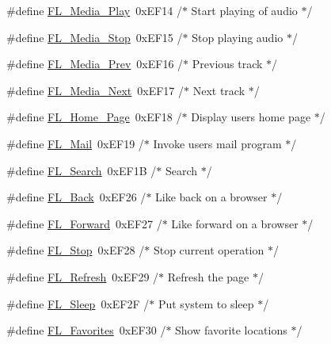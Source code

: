 \begin{Indent}
\begin{DoxyCompactItemize}
\#define \hyperlink{_enumerations_8_h_ad835d80c11553c5910cbf57f17ff77b6}{F\+L\+\_\+\+Media\+\_\+\+Play}~0x\+E\+F14   /$\ast$ Start playing of audio     $\ast$/
\item 
\#define \hyperlink{_enumerations_8_h_a313d081817e6499ae861f95d8c138b0c}{F\+L\+\_\+\+Media\+\_\+\+Stop}~0x\+E\+F15   /$\ast$ Stop playing audio         $\ast$/
\item 
\#define \hyperlink{_enumerations_8_h_a1e8fb91e68eb70283b4f76afca3529fb}{F\+L\+\_\+\+Media\+\_\+\+Prev}~0x\+E\+F16   /$\ast$ Previous track             $\ast$/
\item 
\#define \hyperlink{_enumerations_8_h_a08a4c02d77576954b914b4708d8a8ecb}{F\+L\+\_\+\+Media\+\_\+\+Next}~0x\+E\+F17   /$\ast$ Next track                 $\ast$/
\item 
\#define \hyperlink{_enumerations_8_h_a6f8bd6f6a981fcd248499fe474290c30}{F\+L\+\_\+\+Home\+\_\+\+Page}~0x\+E\+F18   /$\ast$ Display user\textquotesingle{}s home page   $\ast$/
\item 
\#define \hyperlink{_enumerations_8_h_a210eaddbc06c881344b2a1f3f96c33c9}{F\+L\+\_\+\+Mail}~0x\+E\+F19   /$\ast$ Invoke user\textquotesingle{}s mail program $\ast$/
\item 
\#define \hyperlink{_enumerations_8_h_a34ab838e1b43b0f3032fd8949a9cdc97}{F\+L\+\_\+\+Search}~0x\+E\+F1\+B   /$\ast$ Search                     $\ast$/
\item 
\#define \hyperlink{_enumerations_8_h_a4d84842f7c280df258fd0fb8bad02e98}{F\+L\+\_\+\+Back}~0x\+E\+F26   /$\ast$ Like back on a browser     $\ast$/
\item 
\#define \hyperlink{_enumerations_8_h_a48da3f51baf7f6c3c7cc8991b3db822c}{F\+L\+\_\+\+Forward}~0x\+E\+F27   /$\ast$ Like forward on a browser  $\ast$/
\item 
\#define \hyperlink{_enumerations_8_h_ae71aa5f48130c62ab9f4162ebaf3702d}{F\+L\+\_\+\+Stop}~0x\+E\+F28   /$\ast$ Stop current operation     $\ast$/
\item 
\#define \hyperlink{_enumerations_8_h_a11f38eb030e2b705568f3ab0f1afa19b}{F\+L\+\_\+\+Refresh}~0x\+E\+F29   /$\ast$ Refresh the page           $\ast$/
\item 
\#define \hyperlink{_enumerations_8_h_aa11756b6ae4da20e6537da2ce84c385a}{F\+L\+\_\+\+Sleep}~0x\+E\+F2\+F   /$\ast$ Put system to sleep        $\ast$/
\item 
\#define \hyperlink{_enumerations_8_h_ad363513e10d9b636ffd7bd3e336edd3a}{F\+L\+\_\+\+Favorites}~0x\+E\+F30   /$\ast$ Show favorite locations    $\ast$/
\end{DoxyCompactItemize}
\end{Indent}
